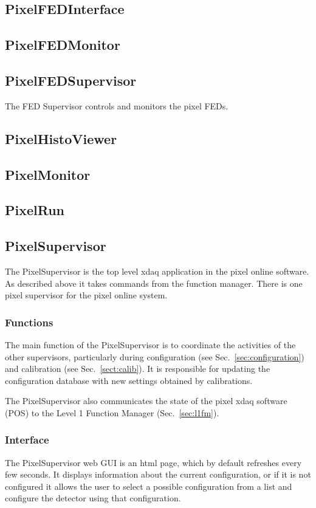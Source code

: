 \subsection{PixelFEDInterface}

\subsection{PixelFEDMonitor}

\subsection{PixelFEDSupervisor}
The FED Supervisor controls and monitors the pixel FEDs.

\subsection{PixelHistoViewer}

\subsection{PixelMonitor}

\subsection{PixelRun}

\subsection{PixelSupervisor}
The PixelSupervisor is the top level xdaq application
in the pixel online software. As described above it takes
commands from the function manager. There is one pixel
supervisor for the pixel online system.

\subsubsection{Functions}
The main function of the PixelSupervisor is to coordinate the
activities of the other supervisors, particularly during configuration
(see Sec.~\ref{sec:configuration}) and calibration (see
Sec.~\ref{sect:calib}). It is responsible for updating the
configuration database with new settings obtained by calibrations.

The PixelSupervisor also communicates the state of the pixel
xdaq software (POS) to the Level 1 Function Manager (Sec.~\ref{sec:l1fm}).

\subsubsection{Interface}
The PixelSupervisor web GUI is an html page, which by default
refreshes every few seconds. It displays information about the current
configuration, or if it is not configured it allows the user to select
a possible configuration from a list and configure the detector using
that configuration.

